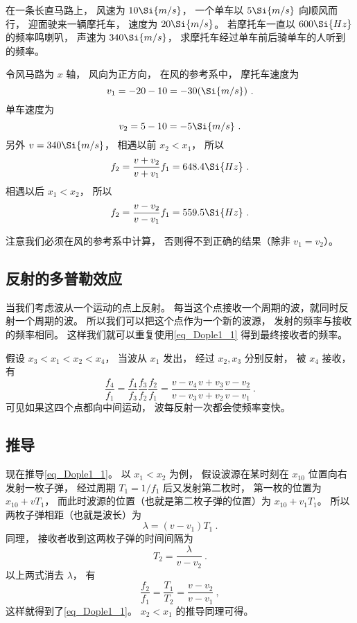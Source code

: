 \begin{exercise}{}
在一条长直马路上， 风速为 $10\Si{m/s}$， 一个单车以 $5\Si{m/s}$ 向顺风而行， 迎面驶来一辆摩托车， 速度为 $20\Si{m/s}$。 若摩托车一直以 $600\Si{Hz}$ 的频率鸣喇叭， 声速为 $340\Si{m/s}$， 求摩托车经过单车前后骑单车的人听到的频率。

令风马路为 $x$ 轴， 风向为正方向， 在风的参考系中， 摩托车速度为
\begin{equation}
v_1 = -20 - 10 = -30(\Si{m/s})~.
\end{equation}
单车速度为
\begin{equation}
v_2 = 5 - 10 = -5\Si{m/s}~.
\end{equation}
另外 $v = 340\Si{m/s}$， 相遇以前 $x_2 < x_1$， 所以
\begin{equation}
f_2 = \frac{v + v_2}{v + v_1} f_1 = 648.4\Si{Hz}~.
\end{equation}
相遇以后 $x_1 < x_2$， 所以
\begin{equation}
f_2 = \frac{v - v_2}{v - v_1} f_1 = 559.5\Si{Hz}~.
\end{equation}
\end{exercise}
注意我们必须在风的参考系中计算， 否则得不到正确的结果（除非 $v_1 = v_2$）。

\subsection{反射的多普勒效应}
当我们考虑波从一个运动的点上反射。 每当这个点接收一个周期的波，就同时反射一个周期的波。 所以我们可以把这个点作为一个新的波源， 发射的频率与接收的频率相同。 这样我们就可以重复使用\autoref{eq_Dople1_1} 得到最终接收者的频率。

\begin{example}{}
假设 $x_3 < x_1 < x_2 < x_4$， 当波从 $x_1$ 发出， 经过 $x_2, x_3$ 分别反射， 被 $x_4$ 接收， 有
\begin{equation}
\frac{f_4}{f_1} = \frac{f_4}{f_3}\frac{f_3}{f_2}\frac{f_2}{f_1}
= \frac{v - v_4}{v - v_3}\frac{v + v_3}{v + v_2}\frac{v - v_2}{v - v_1}~.
\end{equation}
可见如果这四个点都向中间运动， 波每反射一次都会使频率变快。
\end{example}

\subsection{推导}
现在推导\autoref{eq_Dople1_1}。 以 $x_1 < x_2$ 为例， 假设波源在某时刻在 $x_{10}$ 位置向右发射一枚子弹， 经过周期 $T_1 = 1/f_1$ 后又发射第二枚时， 第一枚的位置为 $x_{10} + vT_1$， 而此时波源的位置（也就是第二枚子弹的位置）为 $x_{10} + v_1 T_1$。 所以两枚子弹相距（也就是波长）为
\begin{equation}
\lambda = (v - v_1)T_1~.
\end{equation}
同理， 接收者收到这两枚子弹的时间间隔为
\begin{equation}
T_2 = \frac{\lambda}{v - v_2}~.
\end{equation}
以上两式消去 $\lambda$， 有
\begin{equation}
\frac{f_2}{f_1} = \frac{T_1}{T_2} = \frac{v - v_2}{v - v_1}~,
\end{equation}
这样就得到了\autoref{eq_Dople1_1}。 $x_2 < x_1$ 的推导同理可得。
